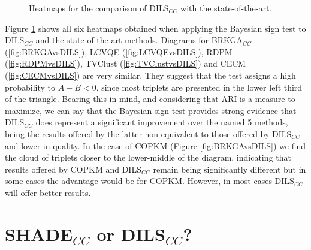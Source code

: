 \begin{figure}[bth]
	\myfloatalign
	 \quad
	 \quad
	\caption[Heatmaps for the comparison of DILS$_{CC}$ with the state-of-the-art.]{Heatmaps for the comparison of \acs{DILS}$_{CC}$ with the state-of-the-art.}
	\label{fig:HeatmapsDILSvsSOTA}
\end{figure}

Figure \ref{fig:HeatmapsDILSvsSOTA} shows all six heatmaps obtained when applying the Bayesian sign test to \acs{DILS}$_{CC}$ and the state-of-the-art methods. Diagrams for \acs{BRKGA}$_{CC}$ (\ref{fig:BRKGAvsDILS}), \acs{LCVQE} (\ref{fig:LCVQEvsDILS}), \acs{RDPM} (\ref{fig:RDPMvsDILS}), \acs{TVClust} (\ref{fig:TVClustvsDILS}) and \acs{CECM} (\ref{fig:CECMvsDILS}) are very similar. They suggest that the test assigns a high probability to $A - B < 0$, since most triplets are presented in the lower left third of the triangle. Bearing this in mind, and considering that \acs{ARI} is a measure to maximize, we can say that the Bayesian sign test provides strong evidence that \acs{DILS}$_{CC}$ does represent a significant improvement over the named 5 methods, being the results offered by the latter non equivalent to those offered by \acs{DILS}$_{CC}$ and lower in quality. In the case of \acs{COPKM} (Figure \ref{fig:BRKGAvsDILS}) we find the cloud of triplets closer to the lower-middle of the diagram, indicating that results offered by \acs{COPKM} and \acs{DILS}$_{CC}$ remain being significantly different but in some cases the advantage would be for \acs{COPKM}. However, in most cases \acs{DILS}$_{CC}$ will offer better results.

\section{SHADE$_{CC}$ or DILS$_{CC}$?} \label{sec:SHADEorDILS}

